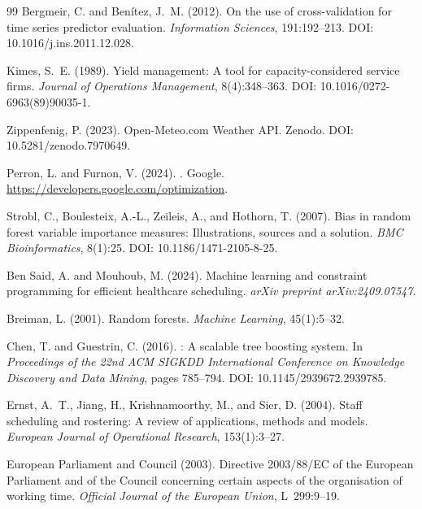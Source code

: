 \documentclass[12pt,a4paper,oneside]{article}
\begin{document}
\begin{thebibliography}{99}
Bergmeir, C. and Ben{\'i}tez, J.~M. (2012).
\newblock On the use of cross-validation for time series predictor evaluation.
\newblock \textit{Information Sciences}, 191:192--213.
\newblock DOI: 10.1016/j.ins.2011.12.028.

Kimes, S.~E. (1989).
\newblock Yield management: A tool for capacity-considered service firms.
\newblock \textit{Journal of Operations Management}, 8(4):348--363.
\newblock DOI: 10.1016/0272-6963(89)90035-1.

Zippenfenig, P. (2023).
\newblock Open-Meteo.com Weather API.
\newblock Zenodo.
\newblock DOI: 10.5281/zenodo.7970649.

Perron, L. and Furnon, V. (2024).
.
\newblock Google. \url{https://developers.google.com/optimization}.

Strobl, C., Boulesteix, A.-L., Zeileis, A., and Hothorn, T. (2007).
\newblock Bias in random forest variable importance measures: Illustrations, sources and a solution.
\newblock \textit{BMC Bioinformatics}, 8(1):25.
\newblock DOI: 10.1186/1471-2105-8-25.

Ben Said, A. and Mouhoub, M. (2024).
\newblock Machine learning and constraint programming for efficient healthcare scheduling.
\newblock \textit{arXiv preprint arXiv:2409.07547}.

Breiman, L. (2001).
\newblock Random forests.
\newblock \textit{Machine Learning}, 45(1):5--32.

Chen, T. and Guestrin, C. (2016).
: A scalable tree boosting system.
\newblock In \textit{Proceedings of the 22nd ACM SIGKDD International Conference on Knowledge Discovery and Data Mining}, pages 785--794.
\newblock DOI: 10.1145/2939672.2939785.

Ernst, A.~T., Jiang, H., Krishnamoorthy, M., and Sier, D. (2004).
\newblock Staff scheduling and rostering: A review of applications, methods and models.
\newblock \textit{European Journal of Operational Research}, 153(1):3--27.

European Parliament and Council (2003).
\newblock Directive 2003/88/{EC} of the European Parliament and of the Council concerning certain aspects of the organisation of working time.
\newblock \textit{Official Journal of the European Union}, L~299:9--19.


\end{thebibliography}
\end{document}

